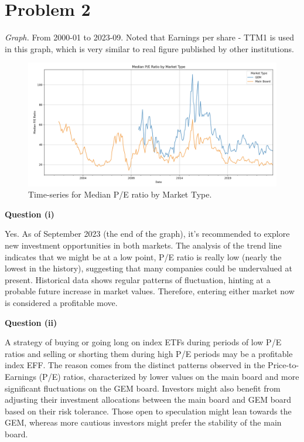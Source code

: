 
\section*{Problem 2}

\textit{Graph.} From 2000-01 to 2023-09. Noted that Earnings per share - TTM1 is used in this graph, which is very similar to real figure published by other institutions.

\begin{figure}[h]
\centering
\includegraphics[width=1\textwidth]{data/median P-E TTM.png}
\caption{Time-series for Median P/E ratio by Market Type.}
\label{fig:example}
\end{figure}


\noindent
\textbf{Question (i)}

Yes. As of September 2023 (the end of the graph), it's recommended to explore new investment opportunities in both markets. The analysis of the trend line indicates that we might be at a low point, P/E ratio is really low (nearly the lowest in the history), suggesting that many companies could be undervalued at present. Historical data shows regular patterns of fluctuation, hinting at a probable future increase in market values. Therefore, entering either market now is considered a profitable move.

\noindent
\textbf{Question (ii)}

A strategy of buying or going long on index ETFs during periods of low P/E ratios and selling or shorting them during high P/E periods may be a profitable index EFF. The reason comes from the distinct patterns observed in the Price-to-Earnings (P/E) ratios, characterized by lower values on the main board and more significant fluctuations on the GEM board. Investors might also benefit from adjusting their investment allocations between the main board and GEM board based on their risk tolerance. Those open to speculation might lean towards the GEM, whereas more cautious investors might prefer the stability of the main board. 

